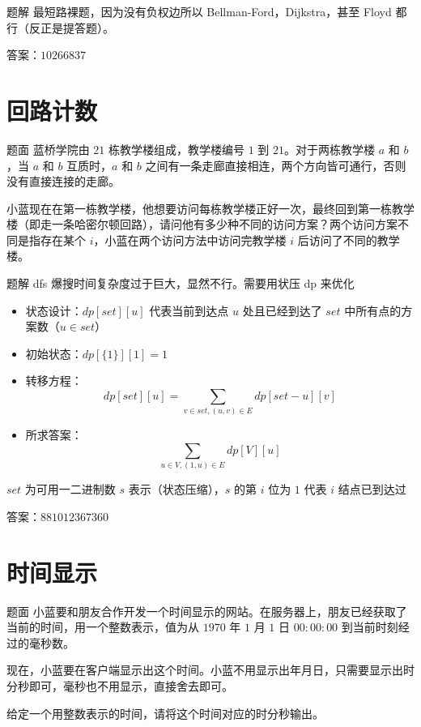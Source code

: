 \documentclass{pptt}
\begin{document}
\begin{frame}{题解}
    最短路裸题，因为没有负权边所以 Bellman-Ford，Dijkstra，甚至 Floyd 都行（反正是提答题）。

    答案：$10266837$
\end{frame}

\section{回路计数}

\begin{frame}{题面}
    蓝桥学院由 $21$ 栋教学楼组成，教学楼编号 $1$ 到 $21$。对于两栋教学楼 $a$ 和 $b$，当 $a$ 和 $b$ 互质时，$a$ 和 $b$ 之间有一条走廊直接相连，两个方向皆可通行，否则没有直接连接的走廊。

    小蓝现在在第一栋教学楼，他想要访问每栋教学楼正好一次，最终回到第一栋教学楼（即走一条哈密尔顿回路），请问他有多少种不同的访问方案？两个访问方案不同是指存在某个 $i$，小蓝在两个访问方法中访问完教学楼 $i$ 后访问了不同的教学楼。
\end{frame}

\begin{frame}{题解}
    dfs 爆搜时间复杂度过于巨大，显然不行。需要用状压 dp 来优化

    \begin{itemize}
        \item 状态设计：$dp[set][u]$ 代表当前到达点 $u$ 处且已经到达了 $set$ 中所有点的方案数（$u \in set$）
        \item 初始状态：$dp[\{1\}][1]=1$
        \item 转移方程：$$dp[set][u]=\sum_{v \in set,(u,v) \in E}dp[set-u][v]$$
        \item 所求答案：$$\sum_{u \in V,(1,u) \in E}dp[V][u]$$
    \end{itemize}

    $set$ 为可用一二进制数 $s$ 表示（状态压缩），$s$ 的第 $i$ 位为 $1$ 代表 $i$ 结点已到达过

    答案：$881012367360$
\end{frame}

\section{时间显示}

\begin{frame}{题面}
    小蓝要和朋友合作开发一个时间显示的网站。在服务器上，朋友已经获取了当前的时间，用一个整数表示，值为从 $1970$ 年 $1$ 月 $1$ 日 $00:00:00$ 到当前时刻经过的毫秒数。

    现在，小蓝要在客户端显示出这个时间。小蓝不用显示出年月日，只需要显示出时分秒即可，毫秒也不用显示，直接舍去即可。

    给定一个用整数表示的时间，请将这个时间对应的时分秒输出。
\end{frame}
\end{document}
